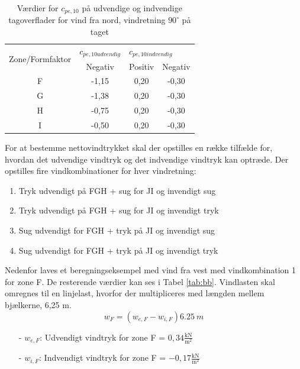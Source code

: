 \begin{table} [H]
	\begin{center}
		\begin{tabular}{ c c c c } 
			\hline
			\multirow{2}{*}{Zone/Formfaktor} & $c_{pe,10 udvendig}$ & \multicolumn{2}{l}{$c_{pe,10 indvendig}$} \\	
			& Negativ & Positiv & Negativ \\ \hline
			F & -1,15 & 0,20 & -0,30 \\	
			G & -1,38 & 0,20 & -0,30 \\ 
			H & -0,75 & 0,20 & -0,30 \\ 
			I & -0,50 & 0,20 & -0,30 \\	
		\end{tabular}
		\caption{Værdier for $c_{pe,10}$ på udvendige og indvendige tagoverflader for vind fra nord, vindretning $90^{\circ}$ på taget}
		\label{tab:kk}
	\end{center}
\end{table}

For at bestemme nettovindtrykket skal der opstilles en række tilfælde for, hvordan det udvendige vindtryk og det indvendige vindtryk kan optræde.  
\newline
\newline
Der opstilles fire vindkombinationer for hver vindretning:
\begin{enumerate}
	\item Tryk udvendigt på FGH + sug for JI og invendigt sug
	\item Tryk udvendigt på FGH + sug for JI og invendigt tryk
	\item Sug udvendigt for FGH + tryk på JI og invendigt sug
	\item Sug udvendigt for FGH + tryk på JI og invendigt tryk
\end{enumerate}

Nedenfor laves et beregningseksempel med vind fra vest med vindkombination 1 for zone F. De resterende værdier kan ses i Tabel \ref{tab:bb}.
\newline
\newline
Vindlasten skal omregnes til en linjelast, hvorfor der multipliceres med længden mellem bjælkerne, 6,25 m.
\begin{equation} 
	w_F = (w_{e,F}-w_{i,F}) \SI{6,25}{m}
\end{equation}

\begin{itemize}
	\item[-] $w_{e,F}$: Udvendigt vindtryk for zone F = $0,\!34 \frac{\text{kN}}{\text{m}^2}$
	\item[-] $w_{i,F}$: Indvendigt vindtryk for zone F = $-0,\!17 \frac{\text{kN}}{\text{m}^2}$
\end{itemize}


